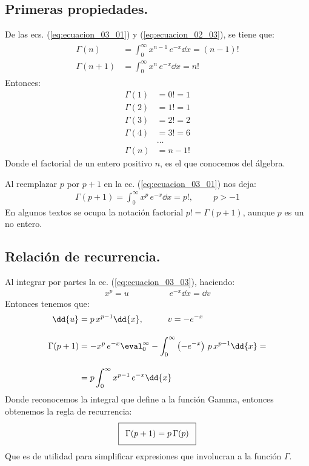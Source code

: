\subsection{Primeras propiedades.}

De las ecs. (\ref{eq:ecuacion_03_01}) y (\ref{eq:ecuacion_02_03}), se tiene que:
\begin{align}
\begin{aligned}
\Gamma (n) &= \int_{0}^{\infty} x^{n-1} \, e^{-x} \dd{x} = (n -1)! \\[1em]
\Gamma (n+1) &= \int_{0}^{\infty} x^{n} \, e^{-x} \dd{x} = n!
\end{aligned}
\label{eq:ecuacion_03_02}
\end{align}
Entonces:
\begin{align*}
\Gamma (1) &= 0! = 1 \\
\Gamma (2) &= 1! = 1 \\
\Gamma (3) &= 2! = 2 \\
\Gamma (4) &= 3! = 6 \\
&\ldots \\
\Gamma (n) &= n-1!
\end{align*}
Donde el factorial de un entero positivo $n$, es el que conocemos del álgebra.
\par
Al reemplazar $p$ por $p+1$ en la ec. (\ref{eq:ecuacion_03_01}) nos deja:
\begin{align}
\Gamma (p+1) = \int_{0}^{\infty} x^{p} \, e^{-x} \dd{x} = p!, \hspace{1cm} p > -1
\label{eq:ecuacion_03_03}
\end{align}
En algunos textos se ocupa la notación factorial $p! = \Gamma (p+1)$, aunque $p$ es un no entero.

\subsection{Relación de recurrencia.}

Al integrar por partes la ec. (\ref{eq:ecuacion_03_03}), haciendo:
\begin{align*}
x^{p} =  u \hspace{2cm} e^{-x} \dd{x} =  \dd{v}
\end{align*}
Entonces tenemos que:
\begin{align*}
\dd{u} &= p \, x^{p-1} \dd{x}, \hspace{1cm} v = - e^{-x} \\[1em]
\Gamma (p+1) &= -x^{p} \, e^{-x} \displaystyle \eval_{0}^{\infty} - \displaystyle \int_{0}^{\infty} \left(-e^{-x} \right) \, p \, x^{p-1} \dd{x} = \\[1em]
&= p \displaystyle \int_{0}^{\infty} x^{p-1} \, e^{-x} \dd{x}
\end{align*}
Donde reconocemos la integral que define a la función Gamma, entonces obtenemos la regla de recurrencia:  
\begin{align}\addtolength{\fboxsep}{5pt}\boxed{
\Gamma (p+1) = p \, \Gamma (p)}
\label{eq:ecuacion_03_04}
\end{align}
Que es de utilidad para simplificar expresiones que involucran a la función $\Gamma$.

